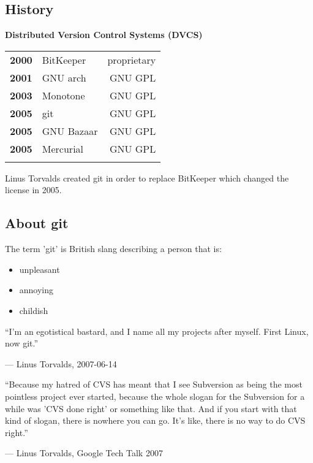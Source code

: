\subsection{History}
\begin{frame}
  \subslidetitle
  \textbf{Distributed Version Control Systems (DVCS)}
  \pause
  \\
  \begin{tabular}{lp{6cm}r}
    \textbf{2000} & BitKeeper  & proprietary \\
    \pause
    \textbf{2001} & GNU arch   & GNU GPL \\
    \pause
    \textbf{2003} & Monotone   & GNU GPL \\
    \pause
    \textbf{2005} & git & GNU GPL \\
    \pause
    \textbf{2005} & GNU Bazaar & GNU GPL \\
    \pause
    \textbf{2005} & Mercurial  & GNU GPL \\
    \pause
  \end{tabular}

  Linus Torvalds created git in order to replace BitKeeper which changed the license in 2005.
\end{frame}

\subsection{About git}
\begin{frame}
  \subslidetitle
   The term 'git' is British slang describing a person that is:
  \begin{itemize}
    \item unpleasant
    \item annoying
    \item childish
  \end{itemize}

  \pause
  \epigraph{``I'm an egotistical bastard, and I name all my projects after myself. First Linux, now git.''}
       {--- Linus Torvalds, 2007-06-14}
  \pause
  \epigraph{``Because my hatred of CVS has meant that I see Subversion as being the most pointless project ever started, because the whole slogan for the Subversion for a while was 'CVS done right' or something like that. And if you start with that kind of slogan, there is nowhere you can go. It's like, there is no way to do CVS right.''}
      {--- Linus Torvalds, Google Tech Talk 2007}
\end{frame}


